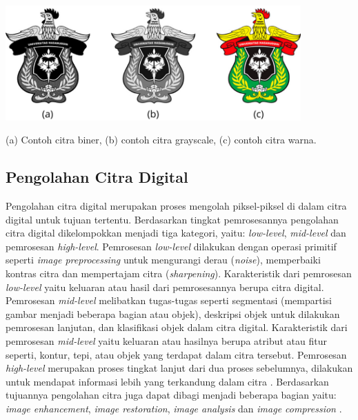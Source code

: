 \begin{afigure}
    \includegraphics[width=0.85\textwidth, center]{images/jenis-jenis-citra.png}
    \caption{(a) Contoh citra biner, (b) contoh citra grayscale, (c) contoh citra warna.}
    \label{fig:jenis-citra}
\end{afigure}


\subsection{Pengolahan Citra Digital}
Pengolahan citra digital merupakan proses mengolah piksel-piksel di dalam citra digital untuk tujuan tertentu. Berdasarkan tingkat pemrosesannya pengolahan citra digital dikelompokkan menjadi tiga kategori, yaitu: \textit{low-level}, \textit{mid-level} dan pemrosesan \textit{high-level}. Pemrosesan \textit{low-level} dilakukan dengan operasi primitif seperti \textit{image preprocessing} untuk mengurangi derau (\textit{noise}), memperbaiki kontras citra dan mempertajam citra (\textit{sharpening}). Karakteristik dari pemrosesan \textit{low-level} yaitu keluaran atau hasil dari pemrosesannya berupa citra digital. Pemrosesan \textit{mid-level} melibatkan tugas-tugas seperti segmentasi (mempartisi gambar menjadi beberapa bagian atau objek), deskripsi objek untuk dilakukan pemrosesan lanjutan, dan klasifikasi objek dalam citra digital. Karakteristik dari pemrosesan \textit{mid-level} yaitu keluaran atau hasilnya berupa atribut atau fitur seperti, kontur, tepi, atau objek yang terdapat dalam citra tersebut. Pemrosesan \textit{high-level} merupakan proses tingkat lanjut dari dua proses sebelumnya, dilakukan untuk mendapat informasi lebih yang terkandung dalam citra .
Berdasarkan tujuannya pengolahan citra juga dapat dibagi menjadi beberapa bagian yaitu: \textit{image enhancement}, \textit{image restoration}, \textit{image analysis} dan \textit{image compression} .


